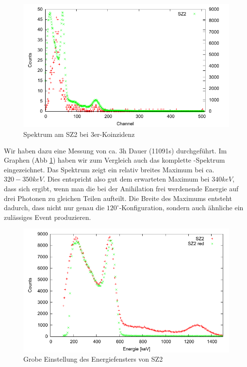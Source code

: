 \begin{figure}
 \includegraphics[width=\textwidth]{Graphen/3er/spektrum-2.pdf}
 \caption{Spektrum am SZ2 bei 3er-Koinzidenz}
 \label{graphen-3er-spektrum-2}
\end{figure}

Wir haben dazu eine Messung von ca. 3h Dauer (11091s) durchgeführt. Im Graphen (Abb \ref{graphen-3er-spektrum-2}) haben wir zum Vergleich auch das komplette \Na-Spektrum eingezeichnet. Das Spektrum zeigt ein relativ breites Maximum bei ca. $320-350 keV$. Dies entspricht also gut dem erwarteten Maximum bei $340 keV$, dass sich ergibt, wenn man die bei der Anihilation frei werdenende Energie auf drei Photonen zu gleichen Teilen aufteilt. Die Breite des Maximums entsteht dadurch, dass nicht nur genau die $120^\circ$-Konfiguration, sondern auch ähnliche ein zulässiges Event produzieren.


\begin{figure}
\includegraphics[width=\textwidth]{Graphen/3er/red-spektrum-sz2.pdf}
 \caption{Grobe Einstellung des Energiefensters von SZ2}
\label{graphen-3er-red-spektrum-sz2}
\end{figure}

